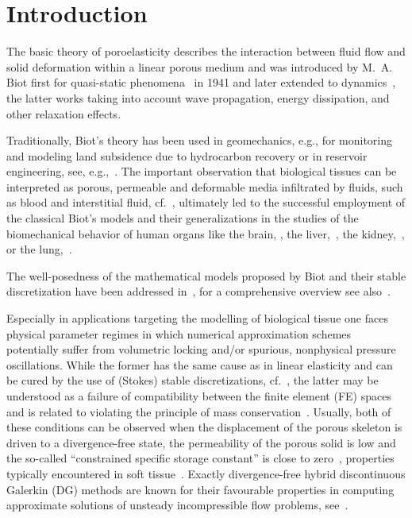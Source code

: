 \documentclass[11pt]{amsart}
\theoremstyle{remark}
\theoremstyle{definition}
\begin{document}
\section{Introduction}\label{sec:introduction} 

The basic theory of poroelasticity describes the interaction between fluid flow and solid deformation within a linear porous
medium and was introduced by M.~A. Biot first for quasi-static phenomena~\cite{Biot1941general} in 1941 and later extended
to dynamics~\cite{Biot1956waves1,Biot1956waves2,Biot1962acoust,Biot1962Mech},  the latter works taking into account
wave propagation, energy dissipation, and other relaxation effects.
  
Traditionally, Biot's theory has been used in geomechanics, e.g., for monitoring and modeling land subsidence due to hydrocarbon
recovery or in reservoir engineering, see, e.g.,~\cite{Barenblatt1960basic,Zenisek1984finite}.
The important observation that biological tissues can be interpreted as porous, permeable and deformable media infiltrated
by fluids, such as blood and interstitial fluid, cf.~\cite{Bothl2022iterative,Pitre2017},
ultimately led to the successful  employment of the classical Biot's models and their generalizations in the studies of the biomechanical
behavior of human organs like the brain, 
\cite{Guo_etal2018subject-specific,
KrLeLyOsSc2022}, 
the liver,~\cite{Aichele2021fluids}, the kidney,~\cite{Ong2009Deformation}, or the lung,~\cite{Dai2014comparison}.
      
The well-posedness of the mathematical models proposed by Biot and their stable discretization have been addressed
in~\cite{Carlson1973Lin,Showalter2000Diff,Zienkiewicz1982Basic,Zenisek1984existence}, for a comprehensive overview
see also~\cite{Cheng2016Poro}.

Especially in applications targeting the modelling of biological tissue one faces physical parameter regimes in which
numerical approximation schemes potentially suffer from volumetric locking and/or spurious, nonphysical pressure oscillations. While the former has the same cause as in linear elasticity and can be cured by the use of (Stokes) stable discretizations,
cf.~\cite{Babuska1992locking}, the latter may be understood as a failure of compatibility between the finite
element (FE) spaces and is related to violating the principle of mass conservation~\cite{Haga2012causes}.
Usually, both of these conditions can be observed when the displacement of the porous skeleton is driven
to a divergence-free state, the permeability of the porous solid is low and the so-called “constrained specific
storage constant” is close to zero~\cite{Phillips2009overcoming}, properties typically encountered in soft
tissue~\cite{Vardakis2016investigating,lee2018mixed}. Exactly divergence-free hybrid discontinuous Galerkin
(DG) methods are known for their favourable properties in computing approximate solutions of unsteady
incompressible flow problems, see~\cite{Lehrenfeld2016high}.
\end{document}
